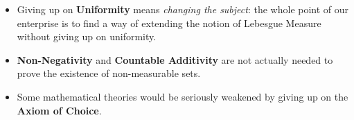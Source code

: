 \documentclass[12pt]{extarticle}
\begin{document}
\begin{itemize}
\item Giving up on \textbf{Uniformity} means \emph{changing the subject}: the whole point of our enterprise is to find a way of extending the notion of Lebesgue Measure without giving up on uniformity. 

\item \textbf{Non-Negativity} and \textbf{Countable Additivity} are not actually needed to prove the existence of non-measurable sets.

\item Some mathematical theories would be seriously weakened by giving up on the \textbf{Axiom of Choice}.

\end{itemize}
\end{document}
